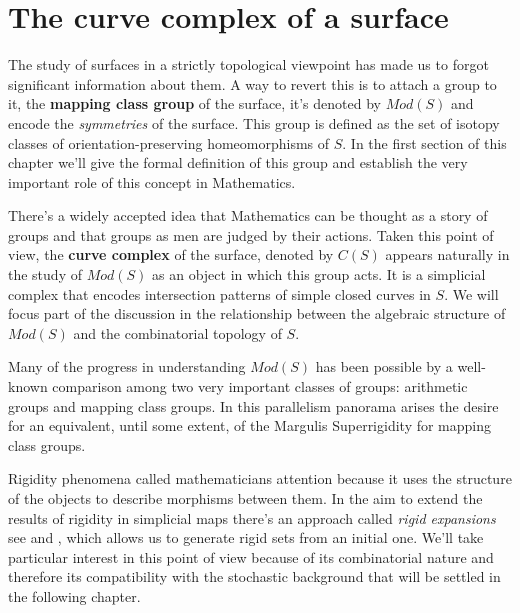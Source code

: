 
\chapter{The curve complex of a surface} %

\label{Chapter1} %



The study of surfaces in a strictly topological viewpoint has made us to forgot significant information about them. A way to revert this is to attach a group to it, the \textbf{mapping class group} of the surface, it's denoted by $Mod(S)$ and encode the \textit{symmetries} of the surface. This group is defined as the set of isotopy classes of orientation-preserving homeomorphisms of $S$. In the first section of this chapter we'll give the formal definition of this group and establish the very important role of this concept in Mathematics. 

There's a widely accepted idea that Mathematics can be thought as a story of groups and that groups as men are judged by their actions. Taken this point of view, the \textbf{curve complex} of the surface, denoted by $C(S)$ appears naturally in the study of $Mod(S)$ as an object in which this group acts. It is a simplicial complex that encodes intersection patterns of simple closed curves in $S$. We will focus part of the discussion in the relationship between the algebraic structure of $Mod(S)$ and the combinatorial topology of $S$.

Many of the progress in understanding $Mod(S)$ has been possible by a well-known comparison among two very important classes of groups: arithmetic groups and mapping class groups. In this parallelism panorama arises the desire for an equivalent, until some extent, of the Margulis Superrigidity for mapping class groups.

Rigidity phenomena called mathematicians attention because it uses the structure of the objects to describe morphisms between them. In the aim to extend the results of rigidity in simplicial maps there's an approach called \textit{rigid expansions} see \cite[Aramayona 16]{rigidExpJA} and \cite[Hernandez 16]{rigidExpJH}, which allows us to generate rigid sets from an initial one. We'll take particular interest in this point of view because of its combinatorial nature and therefore its compatibility with the stochastic background that will be settled in the following chapter.

